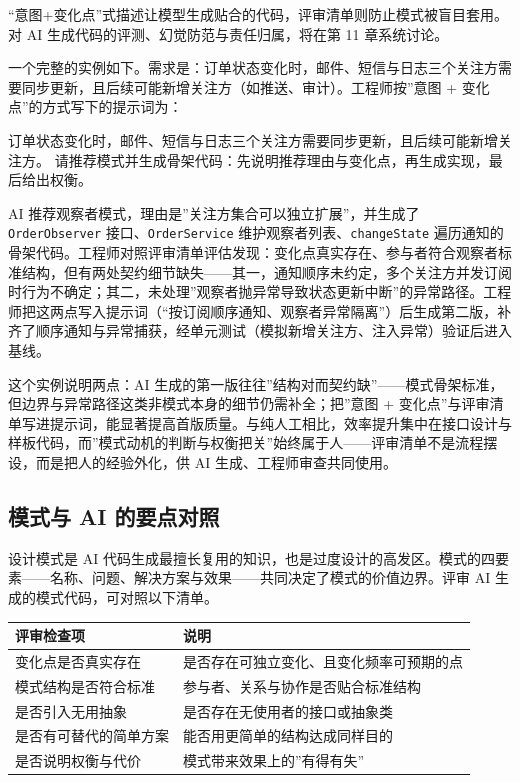 \documentclass[
]{ctexbook}
\newenvironment{Shaded}{
  \ttfamily\small
}{}
\newcommand{\NormalTok}[1]{#1}
\newcounter{none}
\begin{document}
``意图+变化点''式描述让模型生成贴合的代码，评审清单则防止模式被盲目套用。对
AI 生成代码的评测、幻觉防范与责任归属，将在第 11 章系统讨论。

一个完整的实例如下。需求是：订单状态变化时，邮件、短信与日志三个关注方需要同步更新，且后续可能新增关注方（如推送、审计）。工程师按''意图
+ 变化点''的方式写下的提示词为：

\begin{Shaded}
\begin{Highlighting}[]
\NormalTok{订单状态变化时，邮件、短信与日志三个关注方需要同步更新，且后续可能新增关注方。}
\NormalTok{请推荐模式并生成骨架代码：先说明推荐理由与变化点，再生成实现，最后给出权衡。}
\end{Highlighting}
\end{Shaded}

AI 推荐观察者模式，理由是''关注方集合可以独立扩展''，并生成了
\texttt{OrderObserver} 接口、\texttt{OrderService}
维护观察者列表、\texttt{changeState}
遍历通知的骨架代码。工程师对照评审清单评估发现：变化点真实存在、参与者符合观察者标准结构，但有两处契约细节缺失------其一，通知顺序未约定，多个关注方并发订阅时行为不确定；其二，未处理''观察者抛异常导致状态更新中断''的异常路径。工程师把这两点写入提示词（``按订阅顺序通知、观察者异常隔离''）后生成第二版，补齐了顺序通知与异常捕获，经单元测试（模拟新增关注方、注入异常）验证后进入基线。

这个实例说明两点：AI
生成的第一版往往''结构对而契约缺''------模式骨架标准，但边界与异常路径这类非模式本身的细节仍需补全；把''意图
+
变化点''与评审清单写进提示词，能显著提高首版质量。与纯人工相比，效率提升集中在接口设计与样板代码，而''模式动机的判断与权衡把关''始终属于人------评审清单不是流程摆设，而是把人的经验外化，供
AI 生成、工程师审查共同使用。

\subsection{模式与 AI
的要点对照}\label{ux6a21ux5f0fux4e0e-ai-ux7684ux8981ux70b9ux5bf9ux7167}

设计模式是 AI
代码生成最擅长复用的知识，也是过度设计的高发区。模式的四要素------名称、问题、解决方案与效果------共同决定了模式的价值边界。评审
AI 生成的模式代码，可对照以下清单。

{\def\LTcaptype{none} %
\begin{longtable}[]{@{}ll@{}}
\toprule\noalign{}
评审检查项 & 说明 \\
\midrule\noalign{}
\endhead
\bottomrule\noalign{}
\endlastfoot
变化点是否真实存在 & 是否存在可独立变化、且变化频率可预期的点 \\
模式结构是否符合标准 & 参与者、关系与协作是否贴合标准结构 \\
是否引入无用抽象 & 是否存在无使用者的接口或抽象类 \\
是否有可替代的简单方案 & 能否用更简单的结构达成同样目的 \\
是否说明权衡与代价 & 模式带来效果上的''有得有失'' \\
\end{longtable}
}
\end{document}
